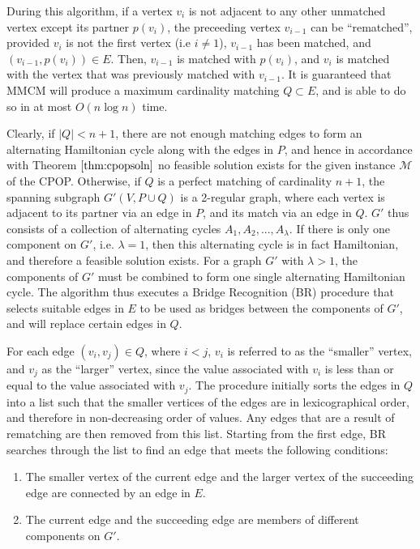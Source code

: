 \documentclass[oribibl]{llncs}
\begin{document}
During this algorithm, if a vertex $v_i$ is not adjacent to any other unmatched vertex except its partner $p(v_i)$, the preceeding vertex $v_{i-1}$ can be ``rematched'', provided $v_i$ is not the first vertex (i.e $i \neq 1$), $v_{i-1}$ has been matched, and $(v_{i-1}, p(v_i)) \in E$. Then, $v_{i-1}$ is matched with $p(v_i)$, and $v_i$ is matched with the vertex that was previously matched with $v_{i-1}$. It is guaranteed that MMCM will produce a maximum cardinality matching $Q \subset E$, and is able to do so in at most $O(n \log n)$ time.

Clearly, if $|Q| < n+1$, there are not enough matching edges to form an alternating Hamiltonian cycle along with the edges in $P$, and hence in accordance with Theorem $\ref{thm:cpopsoln}$ no feasible solution exists for the given instance $\mathcal{M}$ of the CPOP. Otherwise, if $Q$ is a perfect matching of cardinality $n+1$, the spanning subgraph $G'(V, P \cup Q)$ is a 2-regular graph, where each vertex is adjacent to its partner via an edge in $P$, and its match via an edge in $Q$. $G'$ thus consists of a collection of alternating cycles $A_1, A_2, ..., A_{\lambda}$. If there is only one component on $G'$, i.e. $\lambda = 1$, then this alternating cycle is in fact Hamiltonian, and therefore a feasible solution exists. For a graph $G'$ with $\lambda > 1$, the components of $G'$ must be combined to form one single alternating Hamiltonian cycle. The algorithm thus executes a Bridge Recognition (BR) procedure that selects suitable edges in $E$ to be used as bridges between the components of $G'$, and will replace certain edges in $Q$.

For each edge $(v_i, v_j) \in Q$, where $i < j$, $v_i$ is referred to as the ``smaller'' vertex, and $v_j$ as the ``larger'' vertex, since the value associated with $v_i$ is less than or equal to the value associated with $v_j$. The procedure initially sorts the edges in $Q$ into a list such that the smaller vertices of the edges are in lexicographical order, and therefore in non-decreasing order of values. Any edges that are a result of rematching are then removed from this list. Starting from the first edge, BR searches through the list to find an edge that meets the following conditions:
\begin{enumerate}
	\item The smaller vertex of the current edge and the larger vertex of the succeeding edge are connected by an edge in $E$.
	\item The current edge and the succeeding edge are members of different components on $G'$.
\end{enumerate}
\end{document}
